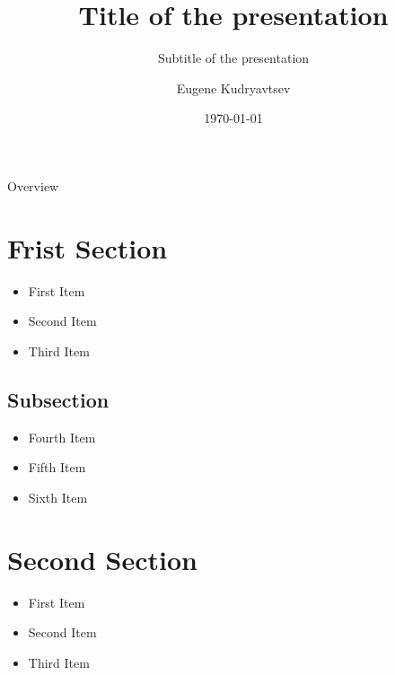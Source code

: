 \documentclass{beamer}
\title{Title of the presentation}
\subtitle{Subtitle of the presentation}
\author[Eugene]{Eugene Kudryavtsev}
\date{\today}
\institute[BFH]{Berner Fachhochschule}
\begin{document}
\begin{frame}[plain]
  \titlepage
\end{frame}

\begin{frame}[noframenumbering]{Overview}
  \tableofcontents
\end{frame}



\section{Frist Section}

\begin{frame}{\insertsection}
  \begin{itemize}
    \item First Item
    \item Second Item
    \item Third Item
  \end{itemize}
\end{frame}

\subsection{Subsection}

\begin{frame}{\insertsection}{\insertsubsection}
  \begin{itemize}
    \item Fourth Item
    \item Fifth Item
    \item Sixth Item
  \end{itemize}
\end{frame}


\section{Second Section}

\begin{frame}{\insertsection}
  \begin{itemize}
    \item First Item
    \item Second Item
    \item Third Item
  \end{itemize}
\end{frame}
\end{document}
